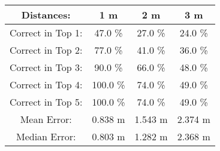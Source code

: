 \begin{tabular}{| c || c | c | c |}
\hline
Distances: & 1 m  & 2 m  & 3 m  \\
\hline
\hline
Correct in Top 1: & 47.0 \% & 27.0 \% & 24.0 \% \\
\hline
Correct in Top 2: & 77.0 \% & 41.0 \% & 36.0 \% \\
\hline
Correct in Top 3: & 90.0 \% & 66.0 \% & 48.0 \% \\
\hline
Correct in Top 4: & 100.0 \% & 74.0 \% & 49.0 \% \\
\hline
Correct in Top 5: & 100.0 \% & 74.0 \% & 49.0 \% \\
\hline
\hline
Mean Error: & 0.838 m & 1.543 m & 2.374 m \\
\hline
Median Error: & 0.803 m & 1.282 m & 2.368 m \\
\hline
\end{tabular}